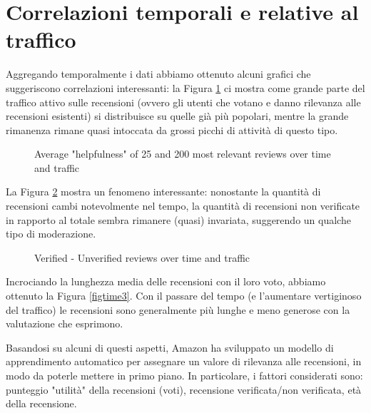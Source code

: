 \section{Correlazioni temporali e relative al traffico}

Aggregando temporalmente i dati abbiamo ottenuto alcuni grafici che suggeriscono correlazioni interessanti: la Figura \ref{figtime1} ci mostra come grande parte del traffico attivo sulle recensioni (ovvero gli utenti che votano e danno rilevanza alle recensioni esistenti) si distribuisce su quelle già più popolari, mentre la grande rimanenza rimane quasi intoccata da grossi picchi di attività di questo tipo.

\begin{figure}[H]

  \centering
  
  \caption{Average "helpfulness" of 25 and 200 most relevant reviews over time and traffic}
    \label{figtime1}
\end{figure}

\par

La Figura \ref{figtime2} mostra un fenomeno interessante: nonostante la quantità di recensioni cambi notevolmente nel tempo, la quantità di recensioni non verificate in rapporto al totale sembra rimanere (quasi) invariata, suggerendo un qualche tipo di moderazione.

\begin{figure}[H]

  \centering
  
  \caption{Verified - Unverified reviews over time and traffic}
  \label{figtime2}
\end{figure}


\par

Incrociando la lunghezza media delle recensioni con il loro voto, abbiamo ottenuto la Figura \ref{figtime3}. Con il passare del tempo (e l'aumentare vertiginoso del traffico) le recensioni sono generalmente più lunghe e meno generose con la valutazione che esprimono.

\par

Basandosi su alcuni di questi aspetti, Amazon ha sviluppato un modello di apprendimento automatico per assegnare un valore di rilevanza alle recensioni, in modo da poterle mettere in primo piano. In particolare, i fattori considerati sono: punteggio "utilità" della recensioni (voti), recensione verificata/non verificata, età della recensione.

